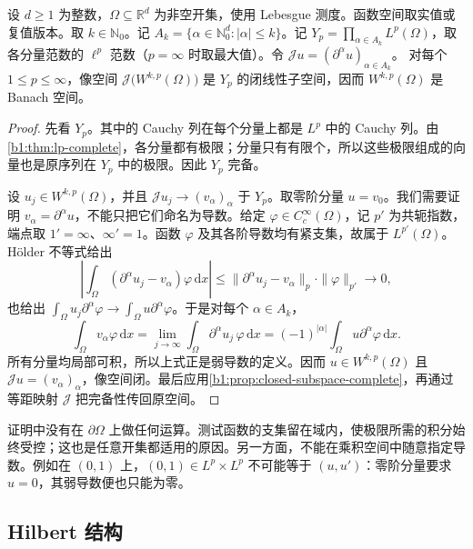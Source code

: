 \begin{theorem}\label{b1:thm:sobolev-complete}
设 \(d\geq1\) 为整数，\(\Omega\subseteq\mathbb R^d\) 为非空开集，使用 Lebesgue 测度。函数空间取实值或复值版本。取 \(k\in\mathbb N_0\)。记 \(A_k=\{\alpha\in\mathbb N_0^d:|\alpha|\leq k\}\)。记 \(Y_p=\prod_{\alpha\in A_k}L^p(\Omega)\)，取各分量范数的 \(\ell^p\) 范数（\(p=\infty\) 时取最大值）。令 \(\mathcal Ju=(\partial^\alpha u)_{\alpha\in A_k}\)。
对每个 \(1\leq p\leq\infty\)，像空间 \(\mathcal J\bigl(W^{k,p}(\Omega)\bigr)\) 是 \(Y_p\) 的闭线性子空间，因而 \(W^{k,p}(\Omega)\) 是 Banach 空间。
\end{theorem}
\begin{proof}
先看 \(Y_p\)。其中的 Cauchy 列在每个分量上都是 \(L^p\) 中的 Cauchy 列。由\cref{b1:thm:lp-complete}，各分量都有极限；分量只有有限个，所以这些极限组成的向量也是原序列在 \(Y_p\) 中的极限。因此 \(Y_p\) 完备。

设 \(u_j\in W^{k,p}(\Omega)\)，并且 \(\mathcal Ju_j\to(v_\alpha)_\alpha\) 于 \(Y_p\)。取零阶分量 \(u=v_0\)。我们需要证明 \(v_\alpha=\partial^\alpha u\)，不能只把它们命名为导数。给定 \(\varphi\in C_c^\infty(\Omega)\)，记 \(p'\) 为共轭指数，端点取 \(1'=\infty\)、\(\infty'=1\)。函数 \(\varphi\) 及其各阶导数均有紧支集，故属于 \(L^{p'}(\Omega)\)。Hölder 不等式给出
\[
 \left|\int_\Omega(\partial^\alpha u_j-v_\alpha)\varphi\,\mathrm dx\right|
 \leq\|\partial^\alpha u_j-v_\alpha\|_p\cdot\|\varphi\|_{p'}
 \longrightarrow0,
\]
也给出 \(\int_\Omega u_j\partial^\alpha\varphi\to\int_\Omega u\partial^\alpha\varphi\)。于是对每个 \(\alpha\in A_k\)，
\[
 \int_\Omega v_\alpha\varphi\,\mathrm dx
 =\lim_{j\to\infty}\int_\Omega\partial^\alpha u_j\,\varphi\,\mathrm dx
 =(-1)^{|\alpha|}\int_\Omega u\partial^\alpha\varphi\,\mathrm dx.
\]
所有分量均局部可积，所以上式正是弱导数的定义。因而 \(u\in W^{k,p}(\Omega)\) 且 \(\mathcal Ju=(v_\alpha)_\alpha\)，像空间闭。最后应用\cref{b1:prop:closed-subspace-complete}，再通过等距映射 \(\mathcal J\) 把完备性传回原空间。
\end{proof}

证明中没有在 \(\partial\Omega\) 上做任何运算。测试函数的支集留在域内，使极限所需的积分始终受控；这也是任意开集都适用的原因。另一方面，不能在乘积空间中随意指定导数。例如在 \((0,1)\) 上，\((0,1)\in L^p\times L^p\) 不可能等于 \((u,u')\)：零阶分量要求 \(u=0\)，其弱导数便也只能为零。

\subsection{Hilbert 结构}
\label{b1:subsec:210202}

